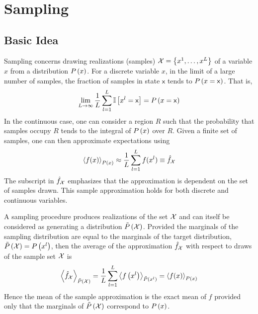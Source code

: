 \section{Sampling}
\label{section12.6}

\subsection{Basic Idea}

Sampling concerns drawing realizations (samples) $\cX=\left\{x^1,\dotsc,x^L\right\}$ of a variable $x$ from a distribution $\P{x}$. For a discrete variable $x$, in the limit of a large number of samples, the fraction of samples in state $\mathsf{x}$ tends to $\P{x=\mathsf{x}}$. That is,
\begin{align*}
	\lim_{L\to\infty}\frac{1}{L}\sum_{l=1}^L\bI\left[x^l=\mathsf{x}\right]=\P{x=\mathsf{x}}
\end{align*}
In the continuous case, one can consider a region $R$ such that the probability that samples occupy $R$ tends to the integral of $\P{x}$ over $R$. Given a finite set of samples, one can then approximate expectations using
\begin{align*}
	\vecx{f(x)}_{\P{x}}\approx\frac{1}{L}\sum_{l=1}^Lf(x^l)\equiv\hat{f}_\cX
\end{align*}
The subscript in $\hat{f}_\cX$ emphasizes that the approximation is dependent on the set of samples drawn. This sample approximation holds for both discrete and continuous variables.

A sampling procedure produces realizations of the set $\cX$ and can itself be considered as generating a distribution $\ti{P}\left(\cX\right)$. Provided the marginals of the sampling distribution are equal to the marginals of the target distribution, $\ti{P}\left(\cX\right)=\P{x^l}$, then the average of the approximation $\hat{f}_\cX$ with respect to draws of the sample set $\cX$ is
\begin{align*}
	\vecx{\hat{f}_\cX}_{\ti{P}\left(\cX\right)}=\frac{1}{L}\sum_{l=1}^L\vecx{f\left(x^l\right)}_{\ti{P}\left(x^l\right)}=\vecx{f(x)}_{\P{x}}
\end{align*}
Hence the mean of the sample approximation is the exact mean of $f$ provided only that the marginals of $\ti{P}\left(\cX\right)$ correspond to $\P{x}$.

